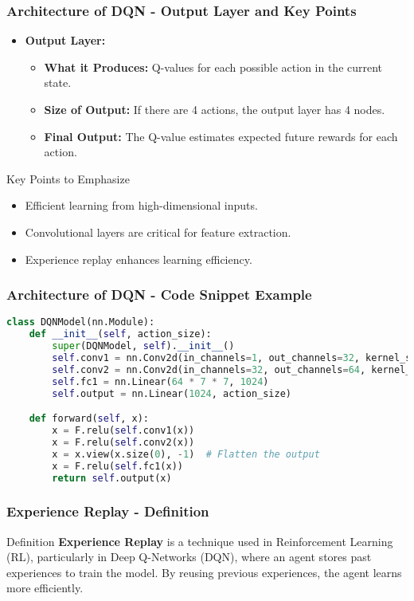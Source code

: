\documentclass{beamer}
\begin{document}
\begin{frame}[fragile]
    \frametitle{Architecture of DQN - Output Layer and Key Points}
    \begin{itemize}
        \item \textbf{Output Layer:}
        \begin{itemize}
            \item \textbf{What it Produces:} Q-values for each possible action in the current state.
            \item \textbf{Size of Output:} If there are 4 actions, the output layer has 4 nodes.
            \item \textbf{Final Output:} The Q-value estimates expected future rewards for each action.
        \end{itemize}
    \end{itemize}

    \begin{block}{Key Points to Emphasize}
        \begin{itemize}
            \item Efficient learning from high-dimensional inputs.
            \item Convolutional layers are critical for feature extraction.
            \item Experience replay enhances learning efficiency.
        \end{itemize}
    \end{block}
\end{frame}

\begin{frame}[fragile]
    \frametitle{Architecture of DQN - Code Snippet Example}
    \begin{lstlisting}[language=Python]
class DQNModel(nn.Module):
    def __init__(self, action_size):
        super(DQNModel, self).__init__()
        self.conv1 = nn.Conv2d(in_channels=1, out_channels=32, kernel_size=8, stride=4)
        self.conv2 = nn.Conv2d(in_channels=32, out_channels=64, kernel_size=4, stride=2)
        self.fc1 = nn.Linear(64 * 7 * 7, 1024)
        self.output = nn.Linear(1024, action_size)

    def forward(self, x):
        x = F.relu(self.conv1(x))
        x = F.relu(self.conv2(x))
        x = x.view(x.size(0), -1)  # Flatten the output
        x = F.relu(self.fc1(x))
        return self.output(x)
    \end{lstlisting}
\end{frame}

\begin{frame}[fragile]
    \frametitle{Experience Replay - Definition}
    \begin{block}{Definition}
        \textbf{Experience Replay} is a technique used in Reinforcement Learning (RL), particularly in Deep Q-Networks (DQN), where an agent stores past experiences to train the model. By reusing previous experiences, the agent learns more efficiently.
    \end{block}
\end{frame}
\end{document}
